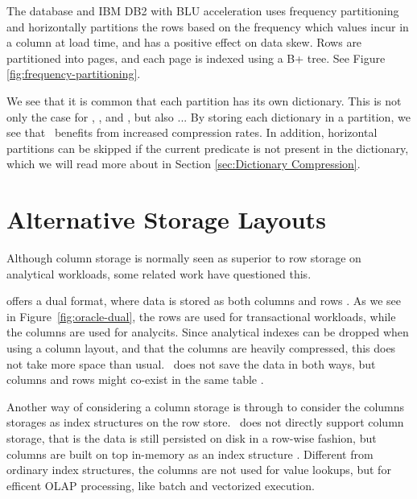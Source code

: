 The  database and IBM DB2 with BLU acceleration  \cite{Barber2012-xt, Raman2013-em, Raman2008-gi} uses frequency partitioning and horizontally partitions the rows based on the frequency which values incur in a column at load time, and has a positive effect on data skew. Rows are partitioned into pages, and each page is indexed using a B+ tree. See Figure \ref{fig:frequency-partitioning}.

We see that it is common that each partition has its own dictionary. This is not only the case for \mssql, \oracle, and \blink, but also ... By storing each dictionary in a partition, we see that \blink~benefits from increased compression rates. In addition, horizontal partitions can be skipped if the current predicate is not present in the dictionary, which we will read more about in Section \ref{sec:Dictionary Compression}.

\section{Alternative Storage Layouts}
\label{sec:Alternative Storage Layouts}
Although column storage is normally seen as superior to row storage on analytical workloads, some related work have questioned this.

\oracle offers a dual format, where data is stored as both columns and rows \cite{Lahiri2015-mz}. As we see in Figure~\ref{fig:oracle-dual}, the rows are used for transactional workloads, while the columns are used for analycits. Since analytical indexes can be dropped when using a column layout, and that the columns are heavily compressed, this does not take more space than usual. \ibm~does not save the data in both ways, but columns and rows might co-exist in the same table \cite{Raman2013-em}.

Another way of considering a column storage is through to consider the columns storages as index structures on the row store. \mssql~does not directly support column storage, that is the data is still persisted on disk in a row-wise fashion, but columns are built on top in-memory as an index structure \cite{noauthor_undated-vq}. Different from ordinary index structures, the columns are not used for value lookups, but for efficent OLAP processing, like batch and vectorized execution. 

